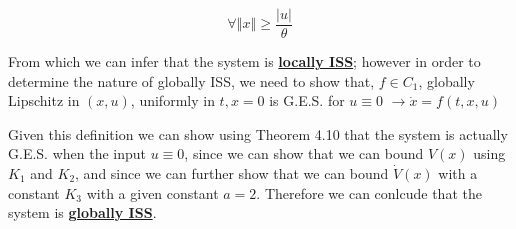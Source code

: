 $$
\forall \left\Vert x\right\Vert \geq \frac{|u|}{\theta}
$$

\noindent From which we can infer that the system is \underline{\textbf{locally ISS}}; however in order to determine the nature of globally ISS, we need to show that, $f \in C_1$, globally Lipschitz in $(x,u)$, uniformly in $t,x =0$ is G.E.S. for $u \equiv 0$  $\rightarrow \dot{x} = f(t,x,u)$


\noindent Given this definition we can show using Theorem 4.10 that the system is actually G.E.S. when the input $u \equiv 0$, since we can show that we can bound $V(x)$ using $K_1$ and $K_2$, and since we can further show that we can bound $\dot{V}(x)$ with a constant $K_3$ with a given constant $a = 2$. Therefore we can conlcude that the system is \underline{\textbf{globally ISS}}.

